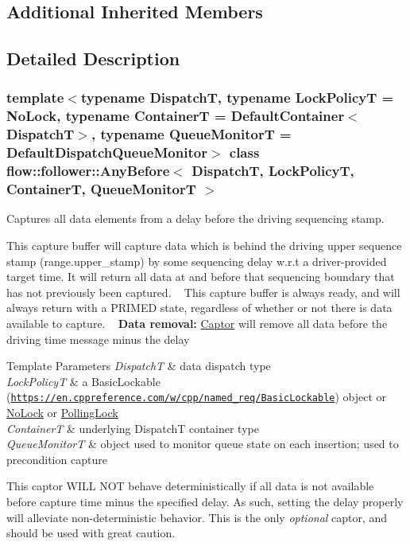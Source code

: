 \subsection*{Additional Inherited Members}


\subsection{Detailed Description}
\subsubsection*{template$<$typename DispatchT, typename Lock\+PolicyT = No\+Lock, typename ContainerT = Default\+Container$<$\+Dispatch\+T$>$, typename Queue\+MonitorT = Default\+Dispatch\+Queue\+Monitor$>$\newline
class flow\+::follower\+::\+Any\+Before$<$ Dispatch\+T, Lock\+Policy\+T, Container\+T, Queue\+Monitor\+T $>$}

Captures all data elements from a delay before the driving sequencing stamp. 

This capture buffer will capture data which is behind the driving upper sequence stamp ({\ttfamily range.\+upper\+\_\+stamp}) by some sequencing delay w.\+r.\+t a driver-\/provided target time. It will return all data at and before that sequencing boundary that has not previously been captured. ~\newline
 This capture buffer is always ready, and will always return with a P\+R\+I\+M\+ED state, regardless of whether or not there is data available to capture. ~\newline
 {\bfseries Data removal\+:} \hyperlink{classflow_1_1_captor}{Captor} will remove all data before the driving time message minus the delay


\begin{DoxyTemplParams}{Template Parameters}
{\em DispatchT} & data dispatch type \\
\hline
{\em Lock\+PolicyT} & a Basic\+Lockable (\href{https://en.cppreference.com/w/cpp/named_req/BasicLockable}{\tt https\+://en.\+cppreference.\+com/w/cpp/named\+\_\+req/\+Basic\+Lockable}) object or \hyperlink{structflow_1_1_no_lock}{No\+Lock} or \hyperlink{structflow_1_1_polling_lock}{Polling\+Lock} \\
\hline
{\em ContainerT} & underlying {\ttfamily DispatchT} container type \\
\hline
{\em Queue\+MonitorT} & object used to monitor queue state on each insertion; used to precondition capture\\
\hline
\end{DoxyTemplParams}
This captor W\+I\+LL N\+OT behave deterministically if all data is not available before capture time minus the specified delay. As such, setting the delay properly will alleviate non-\/deterministic behavior. This is the only {\itshape optional} captor, and should be used with great caution. 

